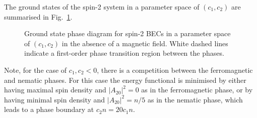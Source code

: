 The ground states of the spin-2 system in a parameter space of \((c_1, c_2)\)
are summarised in Fig.~\ref{fig: spin-2-ground-states}.
\begin{figure}
    \centering
    \caption[Spin-2 ground state phase diagram]
    {\label{fig: spin-2-ground-states}Ground state phase diagram for
        spin-2 BECs in a parameter space of \((c_1, c_2)\) in the absence of a
        magnetic field.
        White dashed lines indicate a first-order phase transition region
        between the phases.}
\end{figure}
Note, for the case of \(c_1, c_2 < 0\), there is a competition between
the ferromagnetic and nematic phases.
For this case the energy functional is minimised by either having maximal spin
density and \(|A_{20}|^2 = 0\) as in the ferromagnetic phase, or by having
minimal spin density and \(|A_{20}|^2 = n/5\) as in the nematic phase, which
leads to a phase boundary at \(c_2n=20c_1n\).

